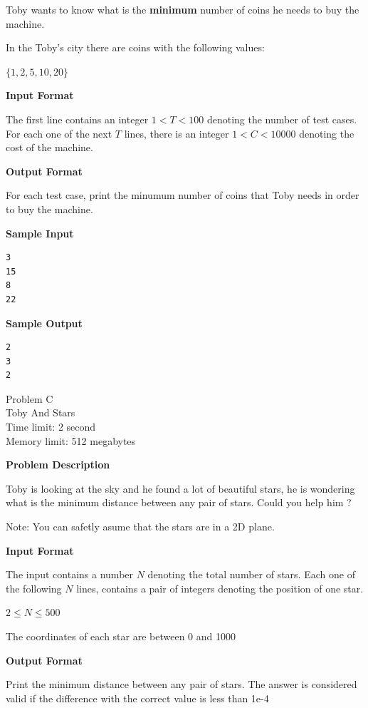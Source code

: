 \documentclass[11pt]{article}
\begin{document}
Toby wants to know what is the \textbf{minimum} number of coins he needs to buy the machine.

In the Toby's city there are coins with the following values:

$\{1, 2, 5, 10, 20\}$


\textbf{\large Input Format}

The first line contains an integer $1 < T < 100$ denoting the number of test cases. For each
one of the next $T$ lines, there is an integer $1 < C < 10000$ denoting the cost of the machine.

\textbf{\large Output Format}

For each test case, print the minumum number of coins that Toby needs in order
to buy the machine.

\textbf{\large Sample Input}

\begin{verbatim}
3
15
8
22
\end{verbatim}

\textbf{\large Sample Output}

\begin{verbatim}
2
3
2
\end{verbatim}

\newpage
        \begin{center}
            {\LARGE Problem C}\\
            {\Large Toby And Stars}\\
            {Time limit: 2 second}\\
            {Memory limit: 512 megabytes}
        \end{center}\textbf{\large Problem Description}

Toby is looking at the sky and he found a lot of beautiful stars, he is
wondering what is the minimum distance between any pair of stars. Could you
help him ?

Note: You can safetly asume that the stars are in a 2D plane.

\textbf{\large Input Format}

The input contains a number $N$ denoting the total number of stars. Each one of
the following $N$ lines, contains a pair of integers denoting the position of
one star.

$2 \le N \le 500$

The coordinates of each star are between 0 and 1000

\textbf{\large Output Format}

Print the minimum distance between any pair of stars. The answer is considered
valid if the difference with the correct value is less than 1e-4
\end{document}
